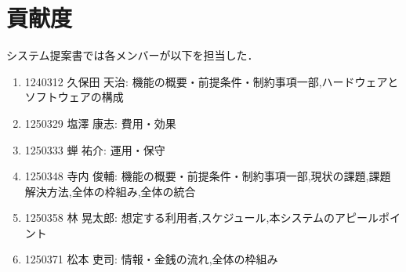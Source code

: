 \documentclass[a4paper, titlepage]{jsarticle}
\begin{document}
\section{貢献度}
システム提案書では各メンバーが以下を担当した．
\begin{enumerate}
    \item 1240312 久保田 天治: 機能の概要・前提条件・制約事項一部,ハードウェアとソフトウェアの構成
    \item 1250329 塩澤 康志: 費用・効果
    \item 1250333 蝉 祐介: 運用・保守
    \item 1250348 寺内 俊輔: 機能の概要・前提条件・制約事項一部,現状の課題,課題解決方法,全体の枠組み,全体の統合
    \item 1250358 林 晃太郎: 想定する利用者,スケジュール,本システムのアピールポイント
    \item 1250371 松本 吏司: 情報・金銭の流れ,全体の枠組み
\end{enumerate}



\end{document}
